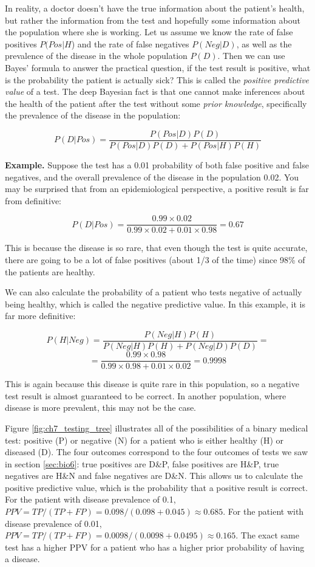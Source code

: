 \documentclass[
  letterpaper,
  DIV=11,
  numbers=noendperiod]{scrreprt}
\begin{document}
In reality, a doctor doesn't have the true information about the
patient's health, but rather the information from the test and hopefully
some information about the population where she is working. Let us
assume we know the rate of false positives \(P(Pos | H\)) and the rate
of false negatives \(P(Neg | D)\), as well as the prevalence of the
disease in the whole population \(P(D)\). Then we can use Bayes' formula
to answer the practical question, if the test result is positive, what
is the probability the patient is actually sick? This is called the
\emph{positive predictive value} of a test. The deep Bayesian fact is
that one cannot make inferences about the health of the patient after
the test without some \emph{prior knowledge}, specifically the
prevalence of the disease in the population:

\[ P(D | Pos) =  \frac{P(Pos|D)P(D)}{P(Pos|D) P(D) + P(Pos | H)P(H)}\]

\textbf{Example.} Suppose the test has a 0.01 probability of both false
positive and false negatives, and the overall prevalence of the disease
in the population 0.02. You may be surprised that from an
epidemiological perspective, a positive result is far from definitive:

\[ P(D | Pos)  = \frac{0.99 \times 0.02}{0.99 \times 0.02 + 0.01 \times 0.98} = 0.67 \]

This is because the disease is so rare, that even though the test is
quite accurate, there are going to be a lot of false positives (about
1/3 of the time) since 98\% of the patients are healthy.

We can also calculate the probability of a patient who tests negative of
actually being healthy, which is called the negative predictive value.
In this example, it is far more definitive:

\[ P(H | Neg)  = \frac{P(Neg|H)P(H)}{P(Neg|H) P(H) + P(Neg | D)P(D)} = \]
\[ = \frac{0.99 \times 0.98}{0.99 \times 0.98 + 0.01 \times 0.02} =  0.9998\]

This is again because this disease is quite rare in this population, so
a negative test result is almost guaranteed to be correct. In another
population, where disease is more prevalent, this may not be the case.

Figure \ref{fig:ch7_testing_tree} illustrates all of the possibilities
of a binary medical test: positive (P) or negative (N) for a patient who
is either healthy (H) or diseased (D). The four outcomes correspond to
the four outcomes of tests we saw in section \ref{sec:bio6}: true
positives are D\&P, false positives are H\&P, true negatives are H\&N
and false negatives are D\&N. This allows us to calculate the positive
predictive value, which is the probability that a positive result is
correct. For the patient with disease prevalence of 0.1,
\(PPV = TP/(TP+FP) = 0.098/(0.098+0.045) \approx 0.685\). For the
patient with disease prevalence of 0.01,
\(PPV = TP/(TP+FP) = 0.0098/(0.0098+0.0495) \approx 0.165\). The exact
same test has a higher PPV for a patient who has a higher prior
probability of having a disease.
\end{document}
